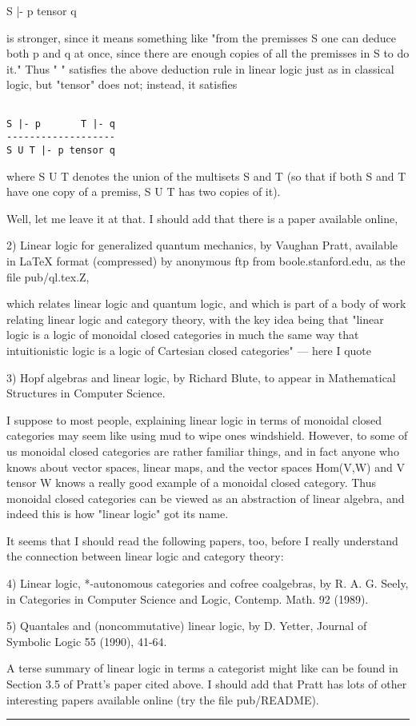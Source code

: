 S |- p tensor q

is stronger, since it means something like "from the premisses S one can
deduce both p and q at once, since there are enough copies of all the
premisses in S to do it."  Thus "\text{\&} " satisfies the above deduction rule
in linear logic just as in classical logic, but "tensor" does not;
instead, it satisfies


\begin{verbatim}

S |- p       T |- q
-------------------
S U T |- p tensor q
\end{verbatim}
    

where S U T denotes the union of the multisets S and T (so that if both
S and T have one copy of a premiss, S U T has two copies of it).  

Well, let me leave it at that.  I should add that there is a paper
available online,

2) Linear logic for generalized quantum mechanics, by Vaughan Pratt, 
available in LaTeX format (compressed) by anonymous ftp from
boole.stanford.edu, as the file pub/ql.tex.Z,

which relates linear logic and quantum logic, and which is part of a body
of work relating linear logic and category theory, with the key idea
being that "linear logic is a logic of monoidal closed categories in
much the same way that intuitionistic logic is a logic of Cartesian
closed categories" --- here I quote

3) Hopf algebras and linear logic, by Richard Blute, to appear in
Mathematical Structures in Computer Science.  

I suppose to most people, explaining linear logic in terms of monoidal
closed categories may seem like using mud to wipe ones windshield.
However, to some of us monoidal closed categories are rather familiar
things, and in fact anyone who knows about vector spaces, linear maps, 
and the vector spaces Hom(V,W) and V tensor W knows a really good
example of a monoidal closed category.  Thus monoidal closed categories
can be viewed as an abstraction of linear algebra, and indeed this is
how "linear logic" got its name.  

It seems that I should read the following papers, too, before I really
understand the connection between linear logic and category theory:

4) Linear logic, *-autonomous categories and cofree coalgebras, by R. A. G.
Seely, in Categories in Computer Science and Logic, Contemp. Math.
92 (1989).  

5) Quantales and (noncommutative) linear logic, by D. Yetter, Journal of
Symbolic Logic 55 (1990), 41-64.

A terse summary of linear logic in terms a categorist might like can be
found in Section 3.5 of Pratt's paper cited above.  I should add that 
Pratt has lots of other interesting papers available online (try the
file pub/README).  
\par\noindent\rule{\textwidth}{0.4pt}

